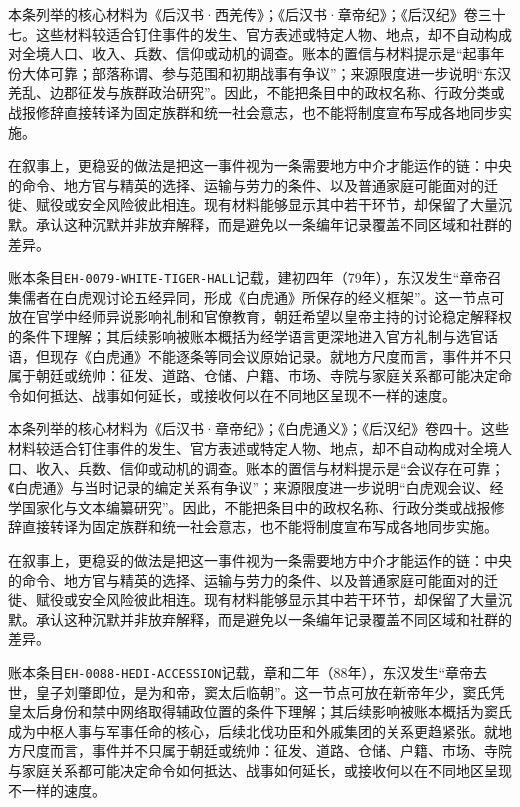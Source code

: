 本条列举的核心材料为《后汉书·西羌传》；《后汉书·章帝纪》；《后汉纪》卷三十七。这些材料较适合钉住事件的发生、官方表述或特定人物、地点，却不自动构成对全境人口、收入、兵数、信仰或动机的调查。账本的置信与材料提示是“起事年份大体可靠；部落称谓、参与范围和初期战事有争议”；来源限度进一步说明“东汉羌乱、边郡征发与族群政治研究”。因此，不能把条目中的政权名称、行政分类或战报修辞直接转译为固定族群和统一社会意志，也不能将制度宣布写成各地同步实施。

在叙事上，更稳妥的做法是把这一事件视为一条需要地方中介才能运作的链：中央的命令、地方官与精英的选择、运输与劳力的条件、以及普通家庭可能面对的迁徙、赋役或安全风险彼此相连。现有材料能够显示其中若干环节，却保留了大量沉默。承认这种沉默并非放弃解释，而是避免以一条编年记录覆盖不同区域和社群的差异。

账本条目\texttt{EH-0079-WHITE-TIGER-HALL}记载，建初四年（79年），东汉发生“章帝召集儒者在白虎观讨论五经异同，形成《白虎通》所保存的经义框架”。这一节点可放在官学中经师异说影响礼制和官僚教育，朝廷希望以皇帝主持的讨论稳定解释权的条件下理解；其后续影响被账本概括为经学语言更深地进入官方礼制与选官话语，但现存《白虎通》不能逐条等同会议原始记录。就地方尺度而言，事件并不只属于朝廷或统帅：征发、道路、仓储、户籍、市场、寺院与家庭关系都可能决定命令如何抵达、战事如何延长，或接收何以在不同地区呈现不一样的速度。

本条列举的核心材料为《后汉书·章帝纪》；《白虎通义》；《后汉纪》卷四十。这些材料较适合钉住事件的发生、官方表述或特定人物、地点，却不自动构成对全境人口、收入、兵数、信仰或动机的调查。账本的置信与材料提示是“会议存在可靠；《白虎通》与当时记录的编定关系有争议”；来源限度进一步说明“白虎观会议、经学国家化与文本编纂研究”。因此，不能把条目中的政权名称、行政分类或战报修辞直接转译为固定族群和统一社会意志，也不能将制度宣布写成各地同步实施。

在叙事上，更稳妥的做法是把这一事件视为一条需要地方中介才能运作的链：中央的命令、地方官与精英的选择、运输与劳力的条件、以及普通家庭可能面对的迁徙、赋役或安全风险彼此相连。现有材料能够显示其中若干环节，却保留了大量沉默。承认这种沉默并非放弃解释，而是避免以一条编年记录覆盖不同区域和社群的差异。

账本条目\texttt{EH-0088-HEDI-ACCESSION}记载，章和二年（88年），东汉发生“章帝去世，皇子刘肇即位，是为和帝，窦太后临朝”。这一节点可放在新帝年少，窦氏凭皇太后身份和禁中网络取得辅政位置的条件下理解；其后续影响被账本概括为窦氏成为中枢人事与军事任命的核心，后续北伐功臣和外戚集团的关系更趋紧张。就地方尺度而言，事件并不只属于朝廷或统帅：征发、道路、仓储、户籍、市场、寺院与家庭关系都可能决定命令如何抵达、战事如何延长，或接收何以在不同地区呈现不一样的速度。

